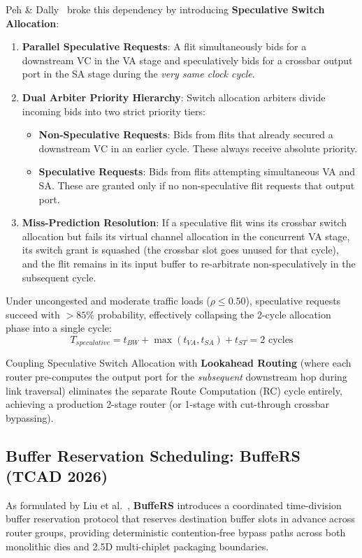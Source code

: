 Peh \& Dally~\cite{Peh2001} broke this dependency by introducing \textbf{Speculative Switch Allocation}:
\begin{enumerate}
    \item \textbf{Parallel Speculative Requests}: A flit simultaneously bids for a downstream VC in the VA stage and speculatively bids for a crossbar output port in the SA stage during the \emph{very same clock cycle}.
    \item \textbf{Dual Arbiter Priority Hierarchy}: Switch allocation arbiters divide incoming bids into two strict priority tiers:
    \begin{itemize}
        \item \textbf{Non-Speculative Requests}: Bids from flits that already secured a downstream VC in an earlier cycle. These always receive absolute priority.
        \item \textbf{Speculative Requests}: Bids from flits attempting simultaneous VA and SA. These are granted only if no non-speculative flit requests that output port.
    \end{itemize}
    \item \textbf{Miss-Prediction Resolution}: If a speculative flit wins its crossbar switch allocation but fails its virtual channel allocation in the concurrent VA stage, its switch grant is squashed (the crossbar slot goes unused for that cycle), and the flit remains in its input buffer to re-arbitrate non-speculatively in the subsequent cycle.
\end{enumerate}

Under uncongested and moderate traffic loads ($\rho \le 0.50$), speculative requests succeed with $>85\%$ probability, effectively collapsing the 2-cycle allocation phase into a single cycle:
\begin{equation}
T_{speculative} = t_{BW} + \max(t_{VA}, t_{SA}) + t_{ST} = 2\text{ cycles}
\label{eq:ch3_spec_latency}
\end{equation}

Coupling Speculative Switch Allocation with \textbf{Lookahead Routing} (where each router pre-computes the output port for the \emph{subsequent} downstream hop during link traversal) eliminates the separate Route Computation (RC) cycle entirely, achieving a production 2-stage router (or 1-stage with cut-through crossbar bypassing).

\subsection{Buffer Reservation Scheduling: BuffeRS (TCAD 2026)}
As formulated by Liu et al.~\cite{Liu2026}, \textbf{BuffeRS} introduces a coordinated time-division buffer reservation protocol that reserves destination buffer slots in advance across router groups, providing deterministic contention-free bypass paths across both monolithic dies and 2.5D multi-chiplet packaging boundaries.

